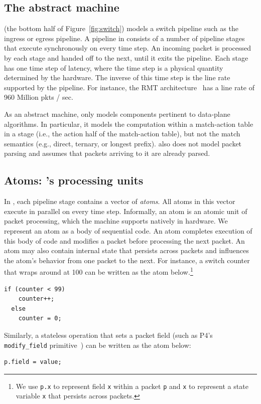 \subsection{The \absmachine abstract machine}

\absmachine (the bottom half of Figure~\ref{fig:switch}) models a switch
pipeline such as the ingress or egress pipeline. A pipeline in \absmachine
consists of a number of pipeline stages that execute synchronously on every
time step. An incoming packet is processed by each stage and handed off to the
next, until it exits the pipeline. Each stage has one time step of latency,
where the time step is a physical quantity determined by the hardware. The
inverse of this time step is the line rate supported by the pipeline. For
instance, the RMT architecture~\cite{rmt} has a line rate of 960 Million pkts /
sec.

As an abstract machine, \absmachine only models components pertinent to
data-plane algorithms. In particular, it models the computation within a
match-action table in a stage (i.e., the action half of the match-action
table), but not the match semantics (e.g., direct, ternary, or longest prefix).
\absmachine also does not model packet parsing and assumes that packets
arriving to it are already parsed.

\subsection{Atoms: \absmachine's processing units}

In \absmachine, each pipeline stage contains a vector of \textit{atoms}. All
atoms in this vector execute in parallel on every time step.  Informally, an
atom is an atomic unit of packet processing, which the \absmachine machine
supports natively in hardware. We represent an atom as a body of sequential
code. An atom completes execution of this body of code and modifies a packet
before processing the next packet.  An atom may also contain internal state
that persists across packets and influences the atom's behavior from one packet
to the next.  For instance, a switch counter that wraps around at 100 can be
written as the atom below.\footnote{We use {\tt p.x} to represent field {\tt x}
  within a packet {\tt p} and {\tt x} to represent a state variable {\tt x}
that persists across packets.}
  \begin{lstlisting}[style=customc, numbers=none, frame=none]
  if (counter < 99)
    counter++;
  else
    counter = 0;
  \end{lstlisting}
Similarly, a stateless operation that sets a packet field (such as P4's {\tt
modify\_field} primitive~\cite{p4spec}) can be written as the atom below:
\begin{lstlisting}[style=customc, numbers=none, frame=none]
  p.field = value;
\end{lstlisting}

